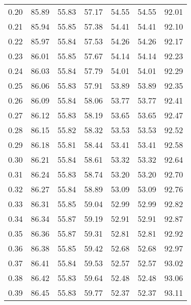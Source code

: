 \begin{tabular}{|c|c|c|c|c|c|c|}
      0.20 &     85.89 &     55.83 &      57.17 &   54.55 &      54.55 &         92.01 \\
      0.21 &     85.94 &     55.85 &      57.38 &   54.41 &      54.41 &         92.10 \\
      0.22 &     85.97 &     55.84 &      57.53 &   54.26 &      54.26 &         92.17 \\
      0.23 &     86.01 &     55.85 &      57.67 &   54.14 &      54.14 &         92.23 \\
      0.24 &     86.03 &     55.84 &      57.79 &   54.01 &      54.01 &         92.29 \\
      0.25 &     86.06 &     55.83 &      57.91 &   53.89 &      53.89 &         92.35 \\
      0.26 &     86.09 &     55.84 &      58.06 &   53.77 &      53.77 &         92.41 \\
      0.27 &     86.12 &     55.83 &      58.19 &   53.65 &      53.65 &         92.47 \\
      0.28 &     86.15 &     55.82 &      58.32 &   53.53 &      53.53 &         92.52 \\
      0.29 &     86.18 &     55.81 &      58.44 &   53.41 &      53.41 &         92.58 \\
      0.30 &     86.21 &     55.84 &      58.61 &   53.32 &      53.32 &         92.64 \\
      0.31 &     86.24 &     55.83 &      58.74 &   53.20 &      53.20 &         92.70 \\
      0.32 &     86.27 &     55.84 &      58.89 &   53.09 &      53.09 &         92.76 \\
      0.33 &     86.31 &     55.85 &      59.04 &   52.99 &      52.99 &         92.82 \\
      0.34 &     86.34 &     55.87 &      59.19 &   52.91 &      52.91 &         92.87 \\
      0.35 &     86.36 &     55.87 &      59.31 &   52.81 &      52.81 &         92.92 \\
      0.36 &     86.38 &     55.85 &      59.42 &   52.68 &      52.68 &         92.97 \\
      0.37 &     86.41 &     55.84 &      59.53 &   52.57 &      52.57 &         93.02 \\
      0.38 &     86.42 &     55.83 &      59.64 &   52.48 &      52.48 &         93.06 \\
      0.39 &     86.45 &     55.83 &      59.77 &   52.37 &      52.37 &         93.11 \\

\end{tabular}

